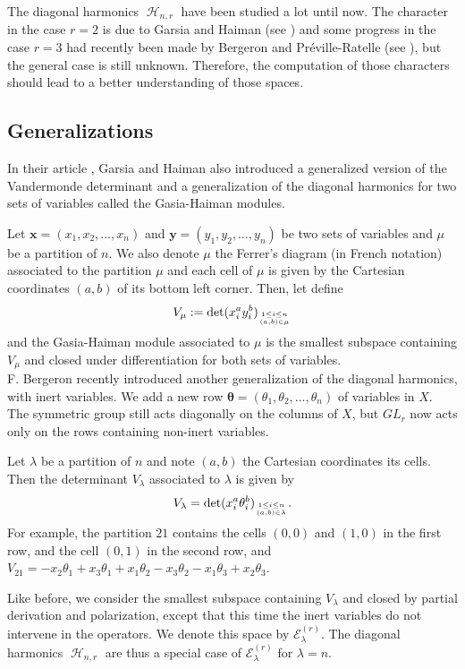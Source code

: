 \documentclass[letter,12pt]{article}
\DeclareMathOperator{\harmonics}{\mathcal{H}}
\begin{document}
	The diagonal harmonics $\harmonics_{n,r}$ have been studied a lot until now. The character in the case $r=2$ is due to Garsia and Haiman (see \cite{GarsiaHaiman1993}) and some progress in the case $r=3$ had recently been made by Bergeron and Préville-Ratelle (see \cite{BergeronPreville2012}), but the general case is still unknown. Therefore, the computation of those characters should lead to a better understanding of those spaces. 
	
	\subsection{Generalizations}
	
	In their article \cite{GarsiaHaiman1993}, Garsia and Haiman also introduced a generalized version of the Vandermonde determinant and a generalization of the diagonal harmonics for two sets of variables called the Gasia-Haiman modules. 
	
	Let $\bm{x}=(x_1, x_2, \dots, x_n)$ and $\bm{y}=(y_1, y_2, \dots, y_n)$ be two sets of variables and $\mu$ be a partition of $n$. We also denote $\mu$ the Ferrer's diagram (in French notation) associated to the partition $\mu$ and each cell of $\mu$ is given by the Cartesian coordinates $(a,b)$ of its bottom left corner. Then, let define
	$$V_{\mu} := \det (x_i^ ay_i^ b)_{1 \leq i \leq n \atop (a,b) \in \mu}$$
	and the Gasia-Haiman module associated to $\mu$ is the smallest subspace containing $V_{\mu}$ and closed under differentiation for both sets of variables. \\
	
	F. Bergeron recently introduced another generalization of the diagonal harmonics, with inert variables. We add a new row $\bm{\theta} = (\theta_1, \theta_2, \dots, \theta_n)$ of variables in $X$. The symmetric group still acts diagonally on the columns of $X$, but $GL_r$ now acts only on the rows containing non-inert variables. 
		 
	Let $\lambda$ be a partition of $n$ and note $(a,b)$ the Cartesian coordinates its cells. Then the determinant $V_{\lambda}$ associated to $\lambda$ is given by $$V_{\lambda} = \det (x_i^a \theta_i^b)_{1 \leq i \leq n \atop (a,b) \in \lambda} .$$
	For example, the partition $21$ contains the cells $(0,0)$ and $(1,0)$ in the first row, and the cell $(0,1)$ in the second row, and $V_{21} = -x_2\theta_1 + x_3\theta_1 + x_1\theta_2 - x_3\theta_2 - x_1\theta_3 + x_2\theta_3$. 
	
	Like before, we consider the smallest subspace containing $V_{\lambda}$ and closed by partial derivation and polarization, except that this time the inert variables do not intervene in the operators. We denote this space by $\mathcal{E}_{\lambda}^{(r)}$. The diagonal harmonics $\harmonics_{n,r}$ are thus a special case of $\mathcal{E}_{\lambda}^{(r)}$ for $\lambda = n$. \\
	
\end{document}
